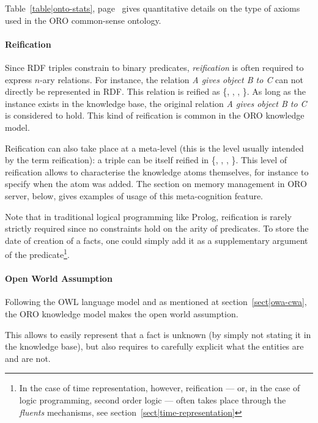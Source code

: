 Table~\ref{table|onto-stats}, page~\pageref{table|onto-stats} gives
quantitative details on the type of axioms used in the ORO common-sense
ontology.

\paragraph{Reification} Since RDF triples constrain to binary predicates,
\emph{reification} is often required to express $n$-ary relations. For
instance, the relation \emph{A gives object B to C} can not directly be
represented in RDF. This relation is reified as \{,
, , \}. As
long as the instance  exists in the knowledge base, the original
relation \emph{A gives object B to C} is considered to hold. This kind of
reification is common in the ORO knowledge model.

Reification can also take place at a meta-level (this is the level usually
intended by the term reification): a triple  can
be itself reified in \{, , , \}.
This level of reification allows to characterise the knowledge atoms
themselves, for instance to specify when the atom was added. The section on
memory management in ORO server, below, gives examples of usage of this
meta-cognition feature.

Note that in traditional logical programming like Prolog, reification is rarely
strictly required since no constraints hold on the arity of predicates. To
store the date of creation of a facts, one could simply add it as a
supplementary argument of the predicate\footnote{In the case of time
representation, however, reification --- or, in the case of logic programming,
second order logic --- often takes place through the \emph{fluents} mechanisms,
see section~\ref{sect|time-representation}}.

\paragraph{Open World Assumption}

Following the OWL language model and as mentioned at
section~\ref{sect|owa-cwa}, the ORO knowledge model makes the open world
assumption.

This allows to easily represent that a fact is unknown (by simply not stating
it in the knowledge base), but also requires to carefully explicit what the
entities are and are not.

